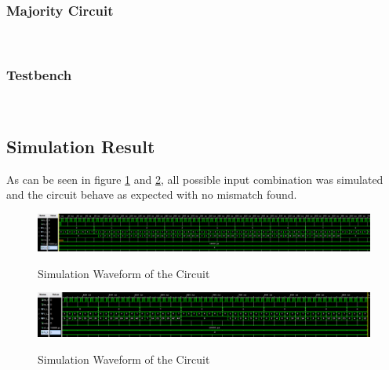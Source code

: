 \documentclass{article}
\begin{document}
\subsubsection*{Majority Circuit}

\;\\
\subsubsection*{Testbench}

\;\\
\subsection*{Simulation Result}
As can be seen in figure \ref{fig:5_1} and \ref{fig:5_2}, all possible input combination was simulated and the circuit behave as expected with no mismatch found.
\begin{figure}[H]
  \centering
  \caption{Simulation Waveform of the Circuit}
  \includegraphics[width=\textwidth]{ECE4304_Midterm1_5_sim_1.png}
  \label{fig:5_1}
\end{figure}
\begin{figure}[H]
  \centering
  \caption{Simulation Waveform of the Circuit}
  \includegraphics[width=\textwidth]{ECE4304_Midterm1_5_sim_2.png}
  \label{fig:5_2}
\end{figure}
\end{document}
